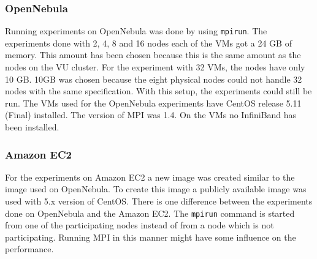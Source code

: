 \subsubsection*{OpenNebula}
Running experiments on OpenNebula was done by using \texttt{mpirun}. The experiments done with 2, 4, 8 and 16 nodes each of the VMs got a 24 GB of memory. This amount has been chosen because this is the same amount as the nodes on the VU cluster. For the experiment with 32 VMs, the nodes have only 10 GB. 10GB was chosen because the eight physical nodes could not handle 32 nodes with the same specification. With this setup, the experiments could still be run. The VMs used for the OpenNebula experiments have CentOS release 5.11 (Final) installed. The version of MPI was 1.4. On the VMs no InfiniBand has been installed.

\subsubsection*{Amazon EC2}
For the experiments on Amazon EC2 a new image was created similar to the image used on OpenNebula. To create this image a publicly available image was used with 5.x version of CentOS. There is one difference between the experiments done on OpenNebula and the Amazon EC2. The \texttt{mpirun} command is started from one of the participating nodes instead of from a node which is not participating. Running MPI in this manner might have some influence on the performance.
